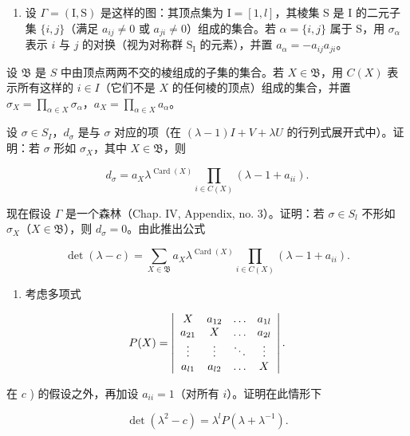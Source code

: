 \begin{enumerate}
\def\labelenumi{\alph{enumi})}
\setcounter{enumi}{2}
\tightlist
\item
  设 \(\Gamma = (\mathrm{I},\mathrm{S})\) 是这样的图：其顶点集为 \(\mathrm{I} = [1,l]\)，其棱集 S 是 I 的二元子集 \(\{i,j\}\)（满足 \(a_{ij}\neq 0\) 或 \(a_{ji}\neq 0\)）组成的集合。若 \(\alpha = \{i,j\}\) 属于 S，用 \(\sigma_{\alpha}\) 表示 \(i\) 与 \(j\) 的对换（视为对称群 \(\mathrm{S_I}\) 的元素），并置 \(a_{\alpha} = -a_{ij}a_{ji}\)。
\end{enumerate}

设 \(\mathfrak{B}\) 是 \(S\) 中由顶点两两不交的棱组成的子集的集合。若 \(X \in \mathfrak{B}\)，用 \(C(X)\) 表示所有这样的 \(i \in I\)（它们不是 \(X\) 的任何棱的顶点）组成的集合，并置 \(\sigma_X = \prod_{\alpha \in X} \sigma_\alpha\)，\(a_X = \prod_{\alpha \in X} a_\alpha\)。

设 \(\sigma \in S_{I}\)，\(d_{\sigma}\) 是与 \(\sigma\) 对应的项（在 \((\lambda - 1)I + V + \lambda U\) 的行列式展开式中）。证明：若 \(\sigma\) 形如 \(\sigma_{X}\)，其中 \(X \in \mathfrak{B}\)，则

\[
d _ {\sigma} = a _ {X} \lambda^ {\operatorname{Card} (X)} \prod_ {i \in C (X)} (\lambda - 1 + a _ {i i}).
\]

现在假设 \(\Gamma\) 是一个森林（Chap. IV, Appendix, no. 3）。证明：若 \(\sigma \in S_l\) 不形如 \(\sigma_X\)（\(X \in \mathfrak{B}\)），则 \(d_{\sigma} = 0\)。由此推出公式

\[
\det (\lambda - c) = \sum_ {X \in \mathfrak {B}} a _ {X} \lambda^ {\operatorname{Card} (X)} \prod_ {i \in C (X)} (\lambda - 1 + a _ {i i}).
\]

\begin{enumerate}
\def\labelenumi{\alph{enumi})}
\setcounter{enumi}{3}
\tightlist
\item
  考虑多项式
\end{enumerate}

\[
P (X) = \left| \begin{array}{c c c c} X & a _ {1 2} & \ldots & a _ {1 l} \\ a _ {2 1} & X & \ldots & a _ {2 l} \\ \vdots & \vdots & \ddots & \vdots \\ a _ {l 1} & a _ {l 2} & \ldots & X \end{array} \right|.
\]

在 \(c\) ) 的假设之外，再加设 \(a_{ii} = 1\)（对所有 \(i\)）。证明在此情形下

\[
\det (\lambda^ {2} - c) = \lambda^ {l} P (\lambda + \lambda^ {- 1}).
\]

